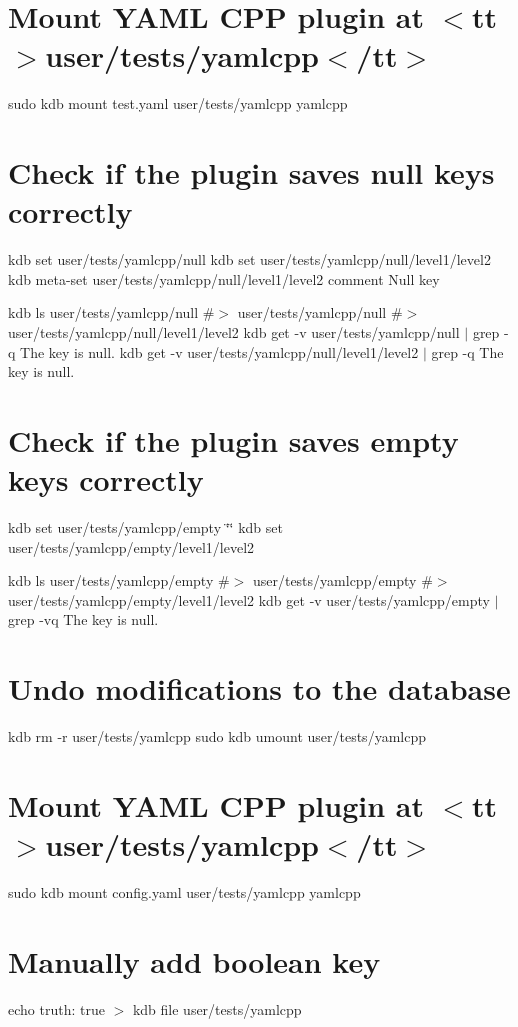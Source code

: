  \hypertarget{autotoc_md780_autotoc_md842}{}\section{Mount Y\+A\+M\+L C\+P\+P plugin at $<$tt$>$user/tests/yamlcpp$<$/tt$>$}\label{autotoc_md780_autotoc_md842}
sudo kdb mount test.\+yaml user/tests/yamlcpp yamlcpp\hypertarget{autotoc_md780_autotoc_md843}{}\section{Check if the plugin saves null keys correctly}\label{autotoc_md780_autotoc_md843}
kdb set user/tests/yamlcpp/null kdb set user/tests/yamlcpp/null/level1/level2 kdb meta-\/set user/tests/yamlcpp/null/level1/level2 comment \textquotesingle{}Null key\textquotesingle{}

kdb ls user/tests/yamlcpp/null \#$>$ user/tests/yamlcpp/null \#$>$ user/tests/yamlcpp/null/level1/level2 kdb get -\/v user/tests/yamlcpp/null $\vert$ grep -\/q \textquotesingle{}The key is null.\textquotesingle{} kdb get -\/v user/tests/yamlcpp/null/level1/level2 $\vert$ grep -\/q \textquotesingle{}The key is null.\textquotesingle{}\hypertarget{autotoc_md780_autotoc_md844}{}\section{Check if the plugin saves empty keys correctly}\label{autotoc_md780_autotoc_md844}
kdb set user/tests/yamlcpp/empty \char`\"{}\char`\"{} kdb set user/tests/yamlcpp/empty/level1/level2

kdb ls user/tests/yamlcpp/empty \#$>$ user/tests/yamlcpp/empty \#$>$ user/tests/yamlcpp/empty/level1/level2 kdb get -\/v user/tests/yamlcpp/empty $\vert$ grep -\/vq \textquotesingle{}The key is null.\textquotesingle{}\hypertarget{autotoc_md780_autotoc_md845}{}\section{Undo modifications to the database}\label{autotoc_md780_autotoc_md845}
kdb rm -\/r user/tests/yamlcpp sudo kdb umount user/tests/yamlcpp 
\begin{DoxyCode}{0}
\DoxyCodeLine{}
\end{DoxyCode}
 \hypertarget{autotoc_md780_autotoc_md846}{}\section{Mount Y\+A\+M\+L C\+P\+P plugin at $<$tt$>$user/tests/yamlcpp$<$/tt$>$}\label{autotoc_md780_autotoc_md846}
sudo kdb mount config.\+yaml user/tests/yamlcpp yamlcpp \hypertarget{autotoc_md780_autotoc_md847}{}\section{Manually add boolean key}\label{autotoc_md780_autotoc_md847}
echo \textquotesingle{}truth\+: true\textquotesingle{} $>$ {\ttfamily kdb file user/tests/yamlcpp}

